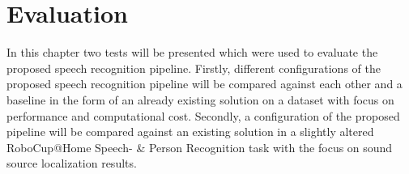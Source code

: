 

\chapter{Evaluation}

In this chapter two tests will be presented which were used to evaluate the proposed speech recognition pipeline. 
Firstly, different configurations of the proposed speech recognition pipeline will be compared against each other and a baseline in the form of an already existing solution on a dataset with focus on performance and computational cost.
Secondly, a configuration of the proposed pipeline will be compared against an existing solution in a slightly altered RoboCup@Home Speech- \& Person Recognition task with the focus on sound source localization results.



\newpage
